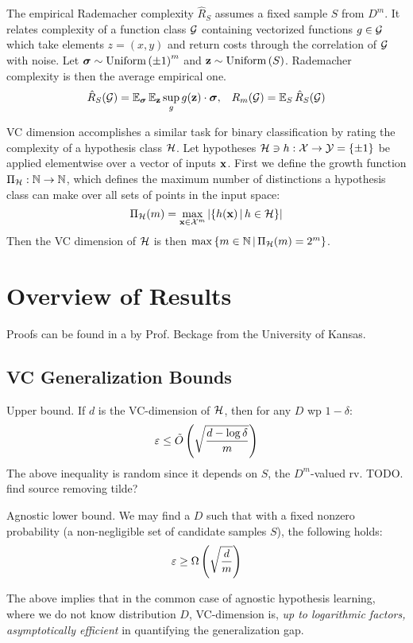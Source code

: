 \documentclass{article}
\begin{document}
The empirical Rademacher complexity $\hat{R}_S$ assumes a fixed sample $S$ from $D^m$. It relates complexity of a function class $\mathcal{G}$ containing vectorized functions $g\in \mathcal{G}$ which take elements $z=(x, y)$ and return costs through the correlation of $\mathcal{G}$ with noise. Let ${\boldsymbol\sigma}\sim \operatorname{Uniform}\left({\pm 1}\right)^m$ and $\textbf{z}\sim\operatorname{Uniform}\left({S}\right)$. Rademacher complexity is then the average empirical one.
$$
\hat{R}_S(\mathcal{G})=\operatorname{\mathbb{E}}_{\boldsymbol\sigma}\operatorname{\mathbb{E}}_{\textbf{z}} \sup_g {g(\textbf{z})\cdot {\boldsymbol\sigma}},\;\;\; R_m(\mathcal{G})=\operatorname{\mathbb{E}}_S\hat{R}_S(\mathcal{G})
$$

VC dimension accomplishes a similar task for binary classification by rating the complexity of a hypothesis class $\mathcal{H}$. Let hypotheses $\mathcal{H}\ni h:\mathcal{X}\rightarrow \mathcal{Y}=\left\{{\pm 1}\right\}$ be applied elementwise over a vector of inputs $\textbf{x}$. First we define the growth function $\Pi_{\mathcal{H}}:\mathbb{N}\rightarrow\mathbb{N}$, which defines the maximum number of distinctions a hypothesis class can make over all sets of points in the input space:
$$
\Pi_{\mathcal{H}}(m)=\max_{\textbf{x}\in\mathcal{X}^m}\left\vert{ \left\{ h(\textbf{x}) \,\middle|\, h\in\mathcal{H}\right\} }\right\vert
$$
Then the VC dimension of $\mathcal{H}$ is then $\max\left\{ m\in\mathbb{N} \,\middle|\, \Pi_{\mathcal{H}}(m)=2^m \right\}$.

\section{Overview of Results}

Proofs can be found in a  by Prof. Beckage from the University of Kansas.

\subsection{VC Generalization Bounds}

Upper bound. If $d$ is the VC-dimension of $\mathcal{H}$, then for any $D$ wp $1-\delta$:
$$
\varepsilon\le \tilde{O}\left({\sqrt{\frac{d-\log \delta}{m}}}\right)
$$
The above inequality is random since it depends on $S$, the $D^m$-valued rv. TODO. find source removing tilde?

Agnostic lower bound. We may find a $D$ such that with a fixed nonzero probability (a non-negligible set of candidate samples $S$), the following holds:
$$
\varepsilon\ge \Omega\left({\sqrt{\frac{d}{m}}}\right)
$$

The above implies that in the common case of agnostic hypothesis learning, where we do not know distribution $D$, VC-dimension is, \textit{up to logarithmic factors, asymptotically efficient} in quantifying the generalization gap.
\end{document}
